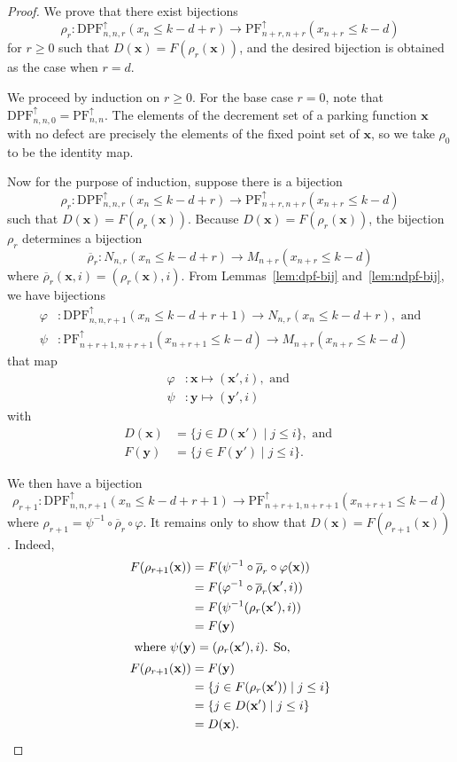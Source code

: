 \documentclass[11pt,reqno]{BICA}
\theoremstyle{definition}
\newcommand{\NDPF}{\mathrm{PF}^{\uparrow}}
\newcommand{\NDDPF}{\mathrm{DPF}^\uparrow}
\newcommand{\x}{\mathbf{x}}
\newcommand{\y}{\mathbf{y}}
\begin{document}
\begin{proof}
    We prove that there exist bijections \[\rho_r: \NDDPF_{n,n,r}(x_n \leq k-d+r) \to \NDPF_{n+r,n+r}(x_{n+r} \leq k-d)\] for $r\geq0$ such that $D(\x)=F(\rho_r(\x))$, and the desired bijection is obtained as the case when $r=d$.

    We proceed by induction on $r\geq0$. For the base case $r=0$, note that $\NDDPF_{n,n,0} = \NDPF_{n,n}$. The elements of the decrement set of a parking function $\x$ with no defect are precisely the elements of the fixed point set of $\x$, so we take $\rho_0$ to be the identity map.

    Now for the purpose of induction, suppose there is a bijection \[\rho_r: \NDDPF_{n,n,r}(x_n \leq k-d+r) \to \NDPF_{n+r,n+r}(x_{n+r} \leq k-d)\] such that $D(\x)=F(\rho_r(\x))$. Because $D(\x)=F(\rho_r(\x))$, the bijection $\rho_r$ determines a bijection \[\overline\rho_r:N_{n,r}(x_n\leq k-d+r)\to M_{n+r}(x_{n+r}\leq k-d)\] where $\overline\rho_r(\x,i)=(\rho_r(\x),i)$. From Lemmas~\ref{lem:dpf-bij} and~\ref{lem:ndpf-bij}, we have bijections
    \begin{align*}
        \varphi&: \NDDPF_{n,n,r+1}(x_n \leq k-d+r+1) \to N_{n,r}(x_n \leq k-d+r),\mbox{  and}\\
        \psi&: \NDPF_{n+r+1,n+r+1}(x_{n+r+1} \leq k-d) \to M_{n+r}(x_{n+r} \leq k-d)
    \end{align*}
    that map
    \begin{align*}
        \varphi&: \x \mapsto (\x', i), \mbox{ and }\\
        \psi&: \y \mapsto (\y', i)
    \end{align*}
    with
    \begin{align*}
        D(\x) &= \{j \in D(\x') \mid j \leq i\},\mbox{ and }\\
        F(\y) &= \{j \in F(\y') \mid j \leq i\}.
    \end{align*}
    
    
    We then have a bijection \[\rho_{r+1}: \NDDPF_{n,n,r+1}(x_n \leq k-d+r+1) \to \NDPF_{n+r+1,n+r+1}(x_{n+r+1} \leq k-d)\] where $\rho_{r+1}=\psi^{-1}\circ\overline\rho_r\circ\varphi$. It remains only to show that $D(\x)=F(\rho_{r+1}(\x))$. Indeed,
    \begin{align*}
        F(\rho_{r+1}(\x))&=F(\psi^{-1}\circ \overline\rho_r\circ\varphi(\x))\\
        &=F(\varphi^{-1}\circ\overline\rho_r(\x',i))\\
        &=F(\psi^{-1}(\rho_r(\x'),i))\\
        &=F(\y)\\
        \intertext{ where $\psi(\y)=(\rho_r(\x'),i)$. So,}
        F(\rho_{r+1}(\x))&=F(\y)\\
        &=\{j\in F(\rho_r(\x'))\mid j\leq i\}\\
        &=\{j\in D(\x')\mid j\leq i\}\\
        &=D(\x).\qedhere
    \end{align*}
\end{proof}
\end{document}
